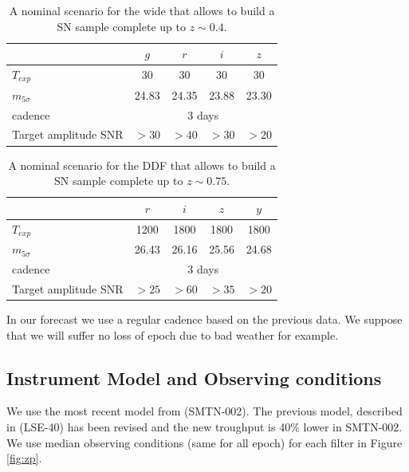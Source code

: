\documentclass[\docopts]{\docclass}
\begin{document}
\begin{table}[t]
\begin{center}
\caption{A nominal scenario for the wide that allows to build a SN
  sample complete up to $z \sim 0.4$.}
\label{tab:nominal_scenario_wide}
\begin{tabular}{l|cccc}
\hline
\hline
              & $g$ & $r$ & $i$ & $z$ \\
\hline 
$T_{exp}$      & 30       &   30    &  30        & 30       \\
$m_{5\sigma}$  &  24.83   &  24.35   &  23.88    &  23.30   \\
cadence       &  \multicolumn{4}{c}{3 days} \\
Target amplitude SNR & $>30$ & $>40$ & $>30$ & $>20$ \\
\hline
\end{tabular}
\end{center}
\end{table}

\begin{table}[t]
\begin{center}
\caption{A nominal scenario for the DDF that allows to build a SN
  sample complete up to $z \sim 0.75$.}
\label{tab:nominal_scenario_DDF}
\begin{tabular}{l|cccc}
\hline
\hline
              & $r$ & $i$ & $z$ & $y$ \\
\hline 
$T_{exp}$      & 1200 & 1800 & 1800 & 1800 \\
$m_{5\sigma}$  & 26.43    & 26.16    &  25.56    &  24.68   \\
cadence       &  \multicolumn{4}{c}{3 days} \\
Target amplitude SNR & $>25$ & $>60$ & $>35$ & $>20$ \\
\hline
\end{tabular}
\end{center}
\end{table}

In our forecast we use a regular cadence based on the previous data. We suppose that we will suffer no loss of epoch due to bad weather for example.

\subsection{Instrument Model and Observing conditions}

We use the most recent model from \cite{SMTN-002} (SMTN-002). The previous model, described in \cite{LSE-40} (LSE-40) has been revised and the new troughput is 40\% lower  in SMTN-002.
We use median observing conditions (same for all epoch) for each filter in Figure \ref{fig:zp}.
\end{document}

